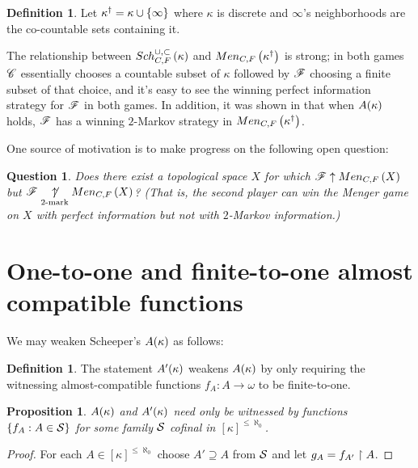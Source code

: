 \documentclass{amsart}
\theoremstyle{plain}
\newtheorem{proposition}[theorem]{Proposition}
\newtheorem{question}[theorem]{Question}
\theoremstyle{definition}
\newtheorem{definition}[theorem]{Definition}
\theoremstyle{remark}
\theoremstyle{plain}
\theoremstyle{definition}
\theoremstyle{remark}
\begin{document}
  \begin{definition}
    Let \(\kappa^\dagger=\kappa\cup\{\infty\}\) where \(\kappa\) is
    discrete and \(\infty\)'s neighborhoods are the co-countable sets
    containing it.
  \end{definition}

  The relationship between \(Sch^{\cup,\subset}_{C,F}\left({\kappa}\right)\) and
  \(Men_{C,F}\left({\kappa^\dagger}\right)\) is strong; in both games \(\mathscr{C}\) essentially
  chooses a countable subset of \(\kappa\) followed by \(\mathscr{F}\) choosing
  a finite subset of that choice, and it's easy to see the winning perfect
  information strategy for \(\mathscr{F}\) in both games.
  In addition, it was shown in
  \cite{clontzMengerGamePreprint} that when \(A(\kappa)\) holds,
  \(\mathscr{F}\) has a winning \(2\)-Markov strategy in
  \(Men_{C,F}\left({\kappa^\dagger}\right)\).

  One source of motivation is to make progress on the following open question:

  \begin{question}\label{mainQuestion}
    Does there exist a topological space \(X\) for which
    \(\mathscr{F}\uparrow Men_{C,F}\left({X}\right)\) but \(\mathscr{F}\underset{2\text{-mark}}{\not\uparrow}Men_{C,F}\left({X}\right)\)?
    (That is, the second player can win the Menger game on \(X\)
    with perfect information but not with \(2\)-Markov information.)
  \end{question}






  \section{One-to-one and finite-to-one almost compatible functions}

  We may weaken Scheeper's \(A(\kappa)\) as follows:

  \begin{definition}
    The statement \(A'(\kappa)\) weakens \(A(\kappa)\) by only
    requiring the witnessing almost-compatible functions \(f_A:A\to\omega\)
    to be finite-to-one.
  \end{definition}

  \begin{proposition}
    \(A(\kappa)\) and \(A'(\kappa)\) need only be witnessed by
    functions \(\{f_A:A\in\mathcal{S}\}\) for some family \(\mathcal{S}\)
    cofinal in \([\kappa]^{\leq\aleph_0}\).
  \end{proposition}

  \begin{proof}
    For each \(A\in[\kappa]^{\leq\aleph_0}\) choose \(A'\supseteq A\)
    from \(\mathcal{S}\) and let \(g_A=f_{A'}\restriction A\).
  \end{proof}
\end{document}
